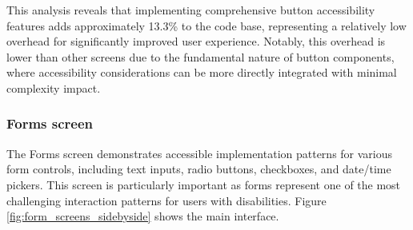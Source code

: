 This analysis reveals that implementing comprehensive button accessibility features adds approximately 13.3\% to the code base, representing a relatively low overhead for significantly improved user experience. Notably, this overhead is lower than other screens due to the fundamental nature of button components, where accessibility considerations can be more directly integrated with minimal complexity impact.

\subsubsection{Forms screen}
\label{subsubsec:forms-screen}

The Forms screen demonstrates accessible implementation patterns for various form controls, including text inputs, radio buttons, checkboxes, and date/time pickers. This screen is particularly important as forms represent one of the most challenging interaction patterns for users with disabilities. Figure \ref{fig:form_screens_sidebyside} shows the main interface.

